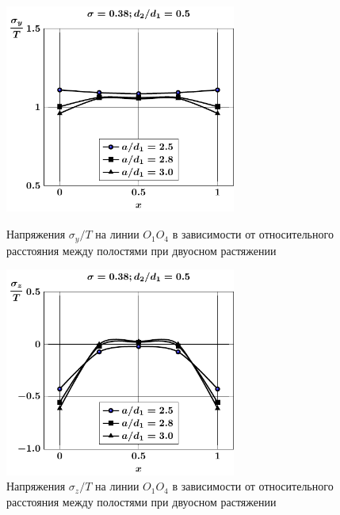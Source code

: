 \begin{russian}
\begin{figure}[h!]
\centering\footnotesize
\parbox[b]{7.5cm}{\centering\includegraphics[width=7.6cm]{cav4-oblate-a-d50-t2-sig_y.pdf}
\caption{Напряжения $\sigma_y/T$ на линии $O_1O_4$ в зависимости от относительного расстояния между полостями при двуосном растяжении
\label{f:10:6}}}\hfil\hfil
\parbox[b]{7.5cm}{\centering\includegraphics[width=7.6cm]{cav4-oblate-a-d50-t2-sig_z.pdf}
\caption{Напряжения $\sigma_z/T$ на линии $O_1O_4$ в зависимости от относительного расстояния между полостями при двуосном растяжении
\label{f:10:7}}}
\end{figure}


\end{russian}
